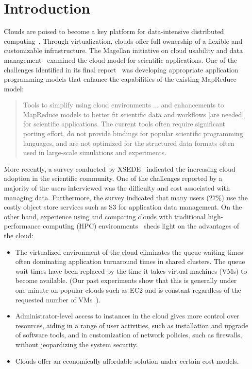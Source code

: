 \documentclass{sig-alternate}
\begin{document}

\section{Introduction}
Clouds are poised to become a key platform for data-intensive distributed 
computing~\cite{cloudreq}. Through virtualization, clouds offer full ownership
of a flexible and customizable infrastructure. The Magellan
initiative on cloud usability and data management~\cite{magellan1} examined the
cloud model for scientific applications. One of the challenges identified in
its final report~\cite{magellan2} was developing appropriate application
programming models that enhance the capabilities of the existing MapReduce
model:

\begin{quote}
Tools to simplify using cloud environments ... and enhancements to
MapReduce models to better fit scientific data and workflows [are needed] for
scientific applications. The current tools often require significant porting
effort, do not provide bindings for popular scientific programming languages,
and are not optimized for the structured data formats often used in large-scale
simulations and experiments. 
\end{quote}

More recently, a survey conducted by XSEDE~\cite{xsede:cloudsurvey} indicated
the increasing cloud adoption in the scientific community. One of the
challenges reported by a majority of the users interviewed was the difficulty
and cost associated with managing data. Furthermore, the survey indicated that
many users (27\%) use the costly object store services such as S3 for
application data management. On the other hand, experience using and comparing
clouds with traditional high-performance computing (HPC)
environments~\cite{marathe, cloudvcluster} sheds light on the advantages of the
cloud:

\begin{itemize}
\item The virtualized environment of the cloud eliminates the queue waiting times
often dominating application turnaround times in shared clusters.
The queue wait times have been replaced by the time it takes virtual machines (VMs) to become
available. (Our past experiments show that this is generally under one minute
on popular clouds such as EC2 and is constant regardless of the requested
number of VMs~\cite{swift13}).

\item Administrator-level access to instances in the cloud gives more control over
resources, aiding in a range of user activities, such as installation and
upgrade of software tools, and in customization of network policies, such as
firewalls, without jeopardizing the system security.

\item Clouds offer an economically affordable solution under certain cost models. 
\end{itemize}
\end{document}
